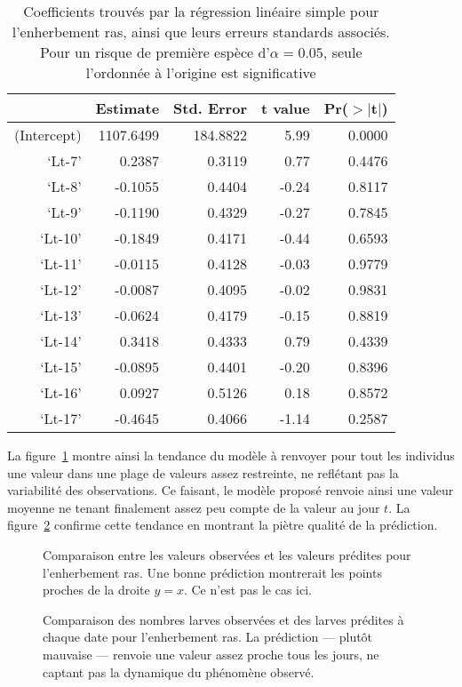 \documentclass[a4paper, 11pt]{article}
\begin{document}
\begin{table}[ht]
\centering
\caption{Coefficients trouvés par la régression linéaire simple pour l'enherbement ras, ainsi que leurs erreurs standards associés. Pour un risque de première espèce d'$\alpha = 0.05$, seule l'ordonnée à l'origine est significative}
\label{tab:lmer}
\begin{tabular}{rrrrr}
 & Estimate & Std. Error & t value & Pr($>$$|$t$|$) \\ 
  \hline
(Intercept) & 1107.6499 & 184.8822 & 5.99 & 0.0000 \\ 
  `Lt-7' & 0.2387 & 0.3119 & 0.77 & 0.4476 \\ 
  `Lt-8' & -0.1055 & 0.4404 & -0.24 & 0.8117 \\ 
  `Lt-9' & -0.1190 & 0.4329 & -0.27 & 0.7845 \\ 
  `Lt-10' & -0.1849 & 0.4171 & -0.44 & 0.6593 \\ 
  `Lt-11' & -0.0115 & 0.4128 & -0.03 & 0.9779 \\ 
  `Lt-12' & -0.0087 & 0.4095 & -0.02 & 0.9831 \\ 
  `Lt-13' & -0.0624 & 0.4179 & -0.15 & 0.8819 \\ 
  `Lt-14' & 0.3418 & 0.4333 & 0.79 & 0.4339 \\ 
  `Lt-15' & -0.0895 & 0.4401 & -0.20 & 0.8396 \\ 
  `Lt-16' & 0.0927 & 0.5126 & 0.18 & 0.8572 \\ 
  `Lt-17' & -0.4645 & 0.4066 & -1.14 & 0.2587 
\end{tabular}
\end{table}

La figure~\ref{fig:lmer1} montre ainsi la tendance du modèle à renvoyer pour tout les individus une valeur dans une plage de valeurs assez restreinte, ne reflétant pas la variabilité des observations. Ce faisant, le modèle proposé renvoie ainsi une valeur moyenne ne tenant finalement assez peu compte de la valeur au jour $t$. La figure~\ref{fig:lmer2} confirme cette tendance en montrant la piètre qualité de la prédiction.

\begin{figure}[ht]
 \centering
 \caption{Comparaison entre les valeurs observées et les valeurs prédites pour l'enherbement ras. Une bonne prédiction montrerait les points proches de la droite $y=x$. Ce n'est pas le cas ici.}
 \label{fig:lmer1}
\end{figure}

\begin{figure}[ht]
 \centering
 \caption{Comparaison des nombres larves observées et des larves prédites à chaque date pour l'enherbement ras. La prédiction --- plutôt mauvaise --- renvoie une valeur assez proche tous les jours, ne captant  pas la dynamique du phénomène observé.}
 \label{fig:lmer2}
\end{figure}
\end{document}
